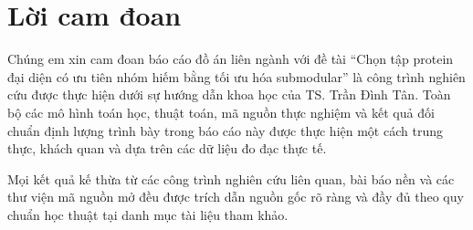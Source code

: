 \chapter*{Lời cam đoan}
{}

Chúng em xin cam đoan báo cáo đồ án liên ngành với đề tài ``Chọn tập protein đại diện có ưu tiên nhóm hiếm bằng tối ưu hóa submodular'' là công trình nghiên cứu được thực hiện dưới sự hướng dẫn khoa học của TS. Trần Đình Tân. Toàn bộ các mô hình toán học, thuật toán, mã nguồn thực nghiệm và kết quả đối chuẩn định lượng trình bày trong báo cáo này được thực hiện một cách trung thực, khách quan và dựa trên các dữ liệu đo đạc thực tế.

\medskip

Mọi kết quả kế thừa từ các công trình nghiên cứu liên quan, bài báo nền và các thư viện mã nguồn mở đều được trích dẫn nguồn gốc rõ ràng và đầy đủ theo quy chuẩn học thuật tại danh mục tài liệu tham khảo.

\clearpage
